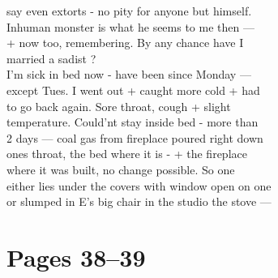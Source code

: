 \documentclass[11pt,a4paper]{article}
\begin{document}
{say even extorts - no pity for anyone but himself. \\
Inhuman monster is what he seems to me then --- \\
+ now too, remembering. By any chance have I \\
married a sadist ? \\
\quad I'm sick in bed now - have been since Monday --- \\
except Tues. I went out + caught more cold + had \\
to go back again. Sore throat, cough + slight \\
temperature. Could'nt stay inside bed - more than \\
2 days --- coal gas from fireplace poured right down \\
ones throat, the bed  where it is - + the fireplace \\
where it was built, no change possible. So one \\
either lies under the covers with window open on one \\
or slumped in E's big chair in the studio  the stove ---}








\section{Pages 38--39}
\end{document}
